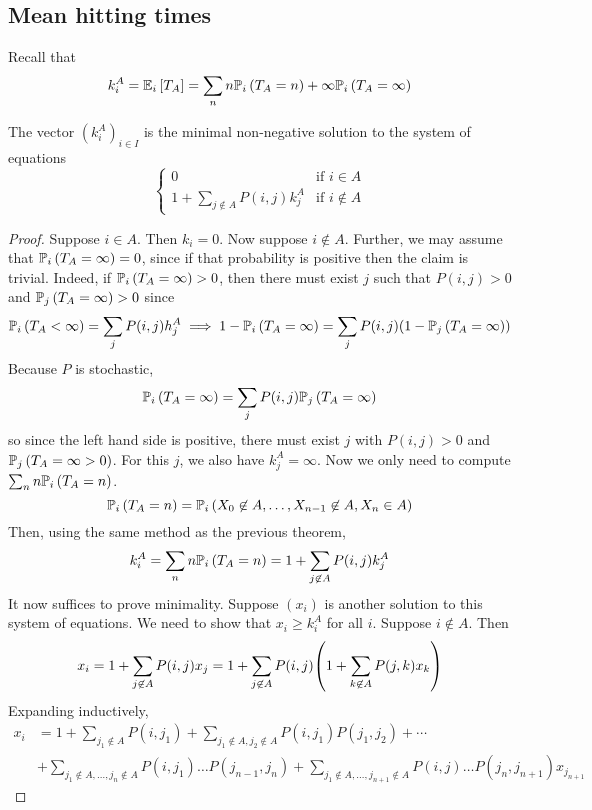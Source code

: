 \subsection{Mean hitting times}
Recall that
\[
	k_i^A = \mathbb{E}_{i}\left[{T_A}\right] = \sum_n n \mathbb{P}_{i}\left({T_A = n}\right) + \infty \mathbb{P}_{i}\left({T_A = \infty}\right)
\]
\begin{theorem}
	The vector \( (k_i^A)_{i \in I} \) is the minimal non-negative solution to the system of equations
	\[
		\begin{cases}
			0                                   & \text{if } i \in A     \\
			1 + \sum_{j \not\in A} P(i,j) k_j^A & \text{if } i \not\in A
		\end{cases}
	\]
\end{theorem}
\begin{proof}
	Suppose \( i \in A \).
	Then \( k_i = 0 \).
	Now suppose \( i \not\in A \).
	Further, we may assume that \( \mathbb{P}_{i}\left({T_A = \infty}\right) = 0 \), since if that probability is positive then the claim is trivial.
	Indeed, if \( \mathbb{P}_{i}\left({T_A = \infty}\right) > 0 \), then there must exist \( j \) such that \( P(i,j) > 0 \) and \( \mathbb{P}_{j}\left({T_A = \infty}\right) > 0 \) since
	\[
		\mathbb{P}_{i}\left({T_A < \infty}\right) = \sum_j P(i,j) h_j^A \implies 1 - \mathbb{P}_{i}\left({T_A = \infty}\right) = \sum_j P(i,j) \qty(1 - \mathbb{P}_{j}\left({T_A = \infty}\right))
	\]
	Because \( P \) is stochastic,
	\[
		\mathbb{P}_{i}\left({T_A = \infty}\right) = \sum_j P(i,j) \mathbb{P}_{j}\left({T_A = \infty}\right)
	\]
	so since the left hand side is positive, there must exist \( j \) with \( P(i,j) > 0 \) and \( \mathbb{P}_{j}\left({T_A = \infty > 0}\right) \).
	For this \( j \), we also have \( k_j^A = \infty \).
	Now we only need to compute \( \sum_n n\mathbb{P}_{i}\left({T_A = n}\right) \).
	\[
		\mathbb{P}_{i}\left({T_A = n}\right) = \mathbb{P}_{i}\left({X_0 \not\in A, \dots, X_{n-1} \not\in A, X_n \in A}\right)
	\]
	Then, using the same method as the previous theorem,
	\[
		k_i^A = \sum_n n \mathbb{P}_{i}\left({T_A = n}\right) = 1 + \sum_{j \not\in A} P(i,j) k_j^A
	\]
	It now suffices to prove minimality.
	Suppose \( (x_i) \) is another solution to this system of equations.
	We need to show that \( x_i \geq k_i^A \) for all \( i \).
	Suppose \( i \not\in A \).
	Then
	\[
		x_i = 1 + \sum_{j \not\in A} P(i,j) x_j = 1 + \sum_{j \not\in A} P(i,j) \qty(1 + \sum_{k \not\in A} P(j,k) x_k)
	\]
	Expanding inductively,
	\begin{align*}
		x_i & = 1 + \sum_{j_1 \not\in A} P(i,j_1) + \sum_{j_1 \not\in A, j_2 \not\in A} P(i,j_1)P(j_1,j_2) + \cdots                                                               \\
		    & + \sum_{j_1 \not\in A, \dots, j_n \not\in A} P(i,j_1) \dots P(j_{n-1}, j_n) + \sum_{j_1 \not\in A, \dots, j_{n+1} \not\in A} P(i,j) \dots P(j_n,j_{n+1})x_{j_{n+1}}

\end{align*}
\end{proof}
